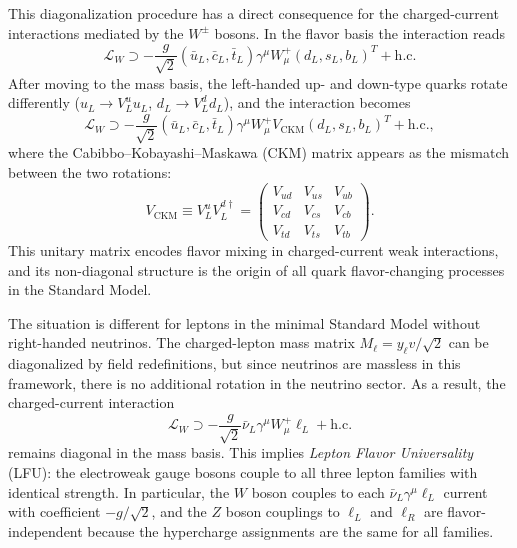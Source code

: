 This diagonalization procedure has a direct consequence for the charged-current interactions mediated by the $W^{\pm}$ bosons. In the flavor basis the interaction reads
\begin{equation}
    \mathcal{L}_{W} \supset -\frac{g}{\sqrt{2}} (\bar{u}_L, \bar{c}_L, \bar{t}_L) \gamma^\mu W_\mu^+ (d_L, s_L, b_L)^T + \text{h.c.}
\end{equation}
After moving to the mass basis, the left-handed up- and down-type quarks rotate differently ($u_L \to V_L^u u_L$, $d_L \to V_L^d d_L$), and the interaction becomes
\begin{equation}
    \mathcal{L}_{W} \supset -\frac{g}{\sqrt{2}} (\bar{u}_L, \bar{c}_L, \bar{t}_L) \gamma^\mu W_\mu^+ V_{\mathrm{CKM}} (d_L, s_L, b_L)^T + \text{h.c.},
\end{equation}
where the Cabibbo–Kobayashi–Maskawa (CKM) matrix appears as the mismatch between the two rotations:
\begin{equation}
    V_{\mathrm{CKM}} \equiv V_{L}^{u} V_{L}^{d \dagger} = \begin{pmatrix}
        V_{ud} & V_{us} & V_{ub} \\
        V_{cd} & V_{cs} & V_{cb} \\
        V_{td} & V_{ts} & V_{tb}
    \end{pmatrix}.
\end{equation}
This unitary matrix encodes flavor mixing in charged-current weak interactions, and its non-diagonal structure is the origin of all quark flavor-changing processes in the Standard Model.

The situation is different for leptons in the minimal Standard Model without right-handed neutrinos. The charged-lepton mass matrix $M_\ell = y_\ell v/\sqrt{2}$ can be diagonalized by field redefinitions, but since neutrinos are massless in this framework, there is no additional rotation in the neutrino sector. As a result, the charged-current interaction
\begin{equation}
    \mathcal{L}_{W} \supset -\frac{g}{\sqrt{2}} \bar{\nu}_L \gamma^\mu W_\mu^+ \ell_L + \text{h.c.}
\end{equation}
remains diagonal in the mass basis. This implies \textit{Lepton Flavor Universality} (LFU): the electroweak gauge bosons couple to all three lepton families with identical strength. In particular, the $W$ boson couples to each $\bar{\nu}_L \gamma^\mu \ell_L$ current with coefficient $-g/\sqrt{2}$, and the $Z$ boson couplings to $\ell_L$ and $\ell_R$ are flavor-independent because the hypercharge assignments are the same for all families.

